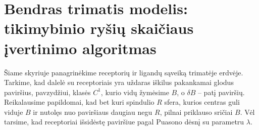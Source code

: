 \documentclass[10pt]{article}
\begin{document}


  


\section{Bendras trimatis modelis: tikimybinio ryšių skaičiaus įvertinimo algoritmas}

Šiame skyriuje panagrinėkime receptorių ir ligandų sąveiką trimatėje erdvėje. Tarkime, kad dalelė su receptoriais yra uždaras iškilus pakankamai glodus paviršius, pavzydžiui, klasės $ C^1 $, kurio vidų žymėsime $ B $, o $ \delta B  $ -- patį paviršių. Reikalausime papildomai, kad bet kuri  spindulio $R$ sfera, kurios centras guli viduje $ B $ ir nutolęs nuo  paviršiaus daugiau negu $ R $, pilnai priklauso sričiai $ B $.  Vėl tarsime, kad receptoriai išsidėstę paviršiue  pagal Puasono dėsnį su parametru $ \lambda $.
\end{document}
